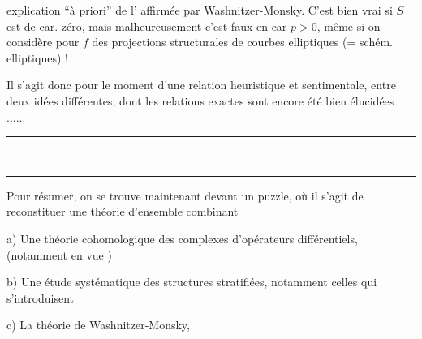 explication ``à priori'' de l'  affirmée par Washnitzer-Monsky. C'est bien vrai si $S$ est de car. zéro, mais malheureusement c'est faux en car $p>0$, même si on considère pour $f$ des projections structurales de  courbes elliptiques (= schém. elliptiques) !

Il s'agit donc pour le moment d'une relation heuristique et sentimentale, entre deux idées différentes, dont les relations exactes sont   encore  été bien élucidées ......

\begin{center}
\rule{.27\linewidth}{.4pt}\\[-.6ex]
\rule{.22\linewidth}{.4pt}
\end{center}

Pour résumer, on se trouve maintenant devant un puzzle, où il s'agit de reconstituer une théorie d'ensemble   combinant

a) Une théorie cohomologique des complexes d'opérateurs différentiels,  (notamment en vue )

b) Une étude systématique des structures stratifiées, notamment  celles qui s'introduisent

c) La théorie de Washnitzer-Monsky,

